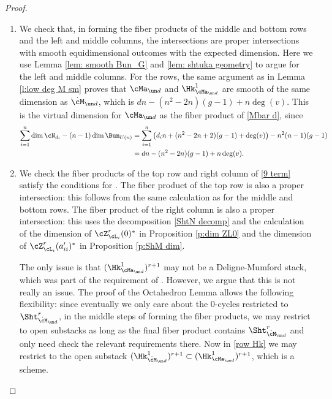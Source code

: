 \begin{proof}
\begin{enumerate}
\item We check that, in forming the fiber products of the middle and bottom rows and the left and middle columns,  the intersections are proper intersections with smooth equidimensional outcomes with the expected dimension. Here we use Lemma \ref{lem: smooth Bun_G} and \ref{lem: shtuka geometry} to argue for the left and middle columns. For the rows, the same argument as in Lemma \ref{l:low deg M sm} proves that $\cMa_{\un d}$ and $\Hk^{1}_{\cMa_{\un d}}$ are smooth of the same dimension as $\dot\cM_{\un d}$, which is $dn-(n^2-2n)(g-1)+n\deg(v)$. This is the virtual dimension for $\cMa_{\un d}$ as the fiber product of \eqref{Mbar d}, since
\begin{align*}
\sum_{i=1}^{n}\dim \cN_{d_{i}}-(n-1)\dim \Bun_{U(n)}  &=\sum_{i=1}^{n} \left(d_{i}n+(n^{2}-2n+2)(g-1)+\deg(v)\right)-n^{2}(n-1)(g-1) \\
&=dn-(n^{2}-2n)(g-1)+n\deg(v).
\end{align*}

\item We check the fiber products of the top row and right column of \eqref{9 term} satisfy the conditions for  \cite[A.2.10]{YZ}. The fiber product of the top row is also a proper intersection: this follows from the same calculation as for the middle and bottom rows. The fiber product of the right column is also a proper intersection: this uses the decomposition \eqref{ShtN decomp} and the calculation of the dimension of $\cZ^{r}_{\cL_{i}}(0)^{*}$ in Proposition \ref{p:dim ZL0} and the dimension of $\cZ^{r}_{\cL_{i}}(a'_{ii})^{*}$ in Proposition \ref{p:ShM dim}.

The only issue is that $(\Hk^{1}_{\cMa_{\un d}})^{r+1}$ may not be a Deligne-Mumford stack, which was part of the requirement of \cite[A.2.10]{YZ}. However, we argue that this is not really an issue. The proof of the Octahedron Lemma allows the following flexibility: since eventually we only care about the $0$-cycles restricted to $\Sht^{r}_{\dot\cM_{\un d}}$, in the middle steps of forming the fiber products, we may restrict to open substacks as long as the final fiber product contains $\Sht^{r}_{\dot\cM_{\un d}}$ and only need check the relevant requirements there. Now in \eqref{row Hk} we may restrict to the open substack $(\Hk^{1}_{\dot\cM_{\un d}})^{r+1}\subset (\Hk^{1}_{\cMa_{\un d}})^{r+1}$, which is  a scheme.



\end{enumerate}
\end{proof}
